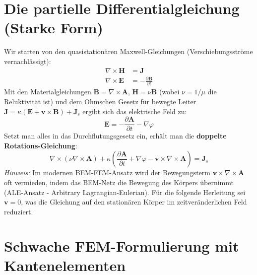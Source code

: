 \documentclass[11pt,a4paper]{article}
\newcommand{\vA}{\bm{A}}
\newcommand{\vB}{\bm{B}}
\newcommand{\vH}{\bm{H}}
\newcommand{\vE}{\bm{E}}
\newcommand{\vJ}{\bm{J}}
\newcommand{\vv}{\bm{v}}
\newcommand{\rot}{\nabla \times}
\newcommand{\grad}{\nabla}
\begin{document}
\section{Die partielle Differentialgleichung (Starke Form)}

Wir starten von den quasistationären Maxwell-Gleichungen (Verschiebungsströme vernachlässigt):
\begin{align}
    \rot \vH &= \vJ \\
    \rot \vE &= -\frac{\partial \vB}{\partial t}
\end{align}
Mit den Materialgleichungen $\vB = \rot \vA$, $\vH = \nu \vB$ (wobei $\nu = 1/\mu$ die Reluktivität ist) und dem Ohmschen Gesetz für bewegte Leiter $\vJ = \kappa (\vE + \vv \times \vB) + \vJ_s$ ergibt sich das elektrische Feld zu:
\begin{equation}
    \vE = -\frac{\partial \vA}{\partial t} - \grad \varphi
\end{equation}
Setzt man alles in das Durchflutungsgesetz ein, erhält man die \textbf{doppelte Rotations-Gleichung}:
\begin{equation}
    \rot (\nu \rot \vA) + \kappa \left( \frac{\partial \vA}{\partial t} + \grad \varphi - \vv \times \rot \vA \right) = \vJ_s \label{eq:strong_form}
\end{equation}
\textit{Hinweis:} Im modernen BEM-FEM-Ansatz wird der Bewegungsterm $\vv \times \rot \vA$ oft vermieden, indem das BEM-Netz die Bewegung des Körpers übernimmt (ALE-Ansatz - Arbitrary Lagrangian-Eulerian). Für die folgende Herleitung sei $\vv = 0$, was die Gleichung auf den stationären Körper im zeitveränderlichen Feld reduziert.

\section{Schwache FEM-Formulierung mit Kantenelementen}
\end{document}
